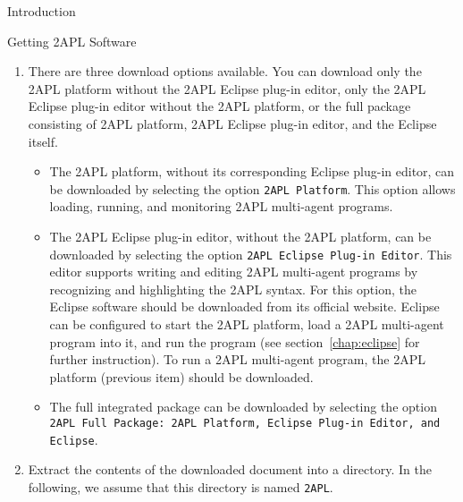 \begin{chapter}{Introduction}
\begin{section}{Getting 2APL Software}
\begin{enumerate}
    \item There are three download options available. You can download
          only the 2APL platform without the 2APL Eclipse plug-in editor,
          only the 2APL Eclipse plug-in editor without the 2APL platform, or
          the full package consisting of 2APL platform, 2APL Eclipse plug-in editor,
          and the Eclipse itself.
          \begin{itemize}
                \item The 2APL platform, without its corresponding Eclipse plug-in
                editor, can be downloaded by selecting the option {\tt 2APL
                Platform}. This option allows loading, running, and
                monitoring 2APL multi-agent programs.
                \item The 2APL Eclipse plug-in editor, without the 2APL
                platform, can be downloaded by selecting the option
                {\tt 2APL Eclipse Plug-in Editor}. This editor
                supports writing and editing 2APL multi-agent programs by recognizing and highlighting the 2APL syntax.
                For this option, the Eclipse software should be downloaded from its official website.
                Eclipse can be configured to start the 2APL platform, load a 2APL multi-agent program into
                it, and run the program (see section~\ref{chap:eclipse} for further
                instruction). To run a 2APL multi-agent program, the
                2APL platform (previous item) should be downloaded.
                \item The full integrated package can be downloaded by
                selecting the option {\tt 2APL Full Package: 2APL Platform, Eclipse Plug-in Editor, and
                Eclipse}.
          \end{itemize}
    \item Extract the contents of the downloaded document into a
          directory. In the following, we assume that this directory is
          named {\tt 2APL}.
\end{enumerate}


\end{section}
\end{chapter}
